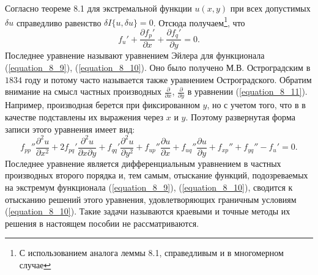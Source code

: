 	\newpage
	\noindent
	Согласно теореме 8.1 для экстремальной функции $u(x,y)$ при всех допустимых $\delta u$ справедливо равенство $\delta I\{u, \delta u\}=0$. Отсюда получаем\footnote{С использованием аналога леммы 8.1, справедливым и в многомерном случае}, что
	\begin{equation}
	\label{equation_8_11}
		f_u' + \frac{\partial f_p'}{\partial x} + \frac{\partial f_q'}{\partial y} = 0.
	\end{equation}
	Последнее уравнение называют уравнением Эйлера для функционала (\ref{equation_8_9}), (\ref{equation_8_10}). Оно было\vspace{1mm} получено М.В. Остроградским в $1834$ году и потому часто называется также \vspace{1mm}уравнением Остроградского. Обратим \vspace{1mm}внимание на смысл частных производных $\frac{\partial}{\partial x}$, $\frac{\partial}{\partial y}$ в уравнении (\ref{equation_8_11}). Например, \vspace{1mm}производная берется при\vspace{1mm} фиксированном $y$, но с учетом того,\vspace{1mm} что в в качестве \vspace{1mm}подставлены их выражения через $x$ и $y$. Поэтому\vspace{1mm} развернутая форма записи этого уравнения имеет вид:
	$$f_{pp}''\frac{\partial^2 u}{\partial x^2} + 2f_{pq}'\frac{\partial^2 u}{\partial x\partial y} + f_{qq}'\frac{\partial^2 u}{\partial y^2} + f_{up}''\frac{\partial u}{\partial x} + f_{uq}''\frac{\partial u}{\partial y} + f_{xp}'' + f_{yq}''-f_u' = 0.$$
	Последнее уравнение\vspace{1mm} является дифференциальным уравнением в частных\vspace{1mm} производных второго порядка\vspace{1mm} и, тем самым, отыскание функций,\vspace{1mm} подозреваемых на экстремум функционала (\ref{equation_8_9}), (\ref{equation_8_10}), сводится\vspace{1mm} к отысканию\vspace{1mm} решений этого уравнения, \vspace{1mm}удовлетворяющих граничным\vspace{1mm} условиям (\ref{equation_8_10}). Такие задачи называются краевыми и точные методы их решения в настоящем \vspace{1mm}пособии не рассматриваются.\vspace{1mm}

